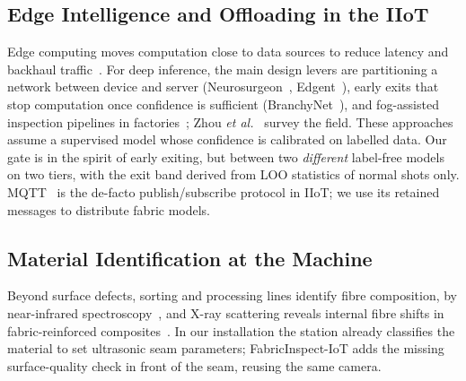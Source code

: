 \subsection{Edge Intelligence and Offloading in the IIoT}
Edge computing moves computation close to data sources to reduce latency and backhaul traffic~\cite{shi2016edge,mao2017mec}. For deep inference, the main design levers are partitioning a network between device and server (Neurosurgeon~\cite{kang2017neurosurgeon}, Edgent~\cite{li2020edgeai}), early exits that stop computation once confidence is sufficient (BranchyNet~\cite{teerapittayanon2016branchynet}), and fog-assisted inspection pipelines in factories~\cite{li2018fog}; Zhou \textit{et al.}~\cite{zhou2019edgeintel} survey the field. These approaches assume a supervised model whose confidence is calibrated on labelled data. Our gate is in the spirit of early exiting, but between two \emph{different} label-free models on two tiers, with the exit band derived from LOO statistics of normal shots only. MQTT~\cite{mqtt311} is the de-facto publish/subscribe protocol in IIoT; we use its retained messages to distribute fabric models.

\subsection{Material Identification at the Machine}
Beyond surface defects, sorting and processing lines identify fibre composition, \eg by near-infrared spectroscopy~\cite{cura2021nir,li2025fabricnet}, and X-ray scattering reveals internal fibre shifts in fabric-reinforced composites~\cite{ozturk2023xray}. In our installation the station already classifies the material to set ultrasonic seam parameters; FabricInspect-IoT adds the missing surface-quality check in front of the seam, reusing the same camera.
